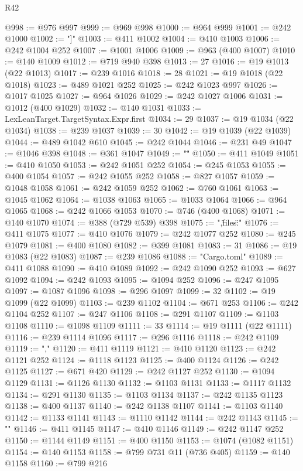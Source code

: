 \begin{lexlean}{R42}
\begin{coremodule}
@998 := @976 @997
@999 := @969 @998
@1000 := @964 @999
@1001 := @242 @1000
@1002 := "]"
@1003 := @411 @1002
@1004 := @410 @1003
@1006 := @242 @1004 @252
@1007 := @1001 @1006
@1009 := @963 (@400 @1007)
@1010 := @140 @1009
@1012 := @719 @940 @398
@1013 := 27
@1016 := @19 @1013 (@22 @1013)
@1017 := @239 @1016
@1018 := 28
@1021 := @19 @1018 (@22 @1018)
@1023 := @489 @1021 @252
@1025 := @242 @1023 @997
@1026 := @1017 @1025
@1027 := @964 @1026
@1029 := @242 @1027 @1006
@1031 := @1012 (@400 @1029)
@1032 := @140 @1031
@1033 := LexLeanTarget.TargetSyntax.Expr.first
@1034 := 29
@1037 := @19 @1034 (@22 @1034)
@1038 := @239 @1037
@1039 := 30
@1042 := @19 @1039 (@22 @1039)
@1044 := @489 @1042 @610
@1045 := @242 @1044
@1046 := @231 @49
@1047 := @1046 @398
@1048 := @361 @1047
@1049 := "\""
@1050 := @411 @1049
@1051 := @410 @1050
@1053 := @242 @1051 @252
@1054 := @245 @1053
@1055 := @400 @1054
@1057 := @242 @1055 @252
@1058 := @827 @1057
@1059 := @1048 @1058
@1061 := @242 @1059 @252
@1062 := @760 @1061
@1063 := @1045 @1062
@1064 := @1038 @1063
@1065 := @1033 @1064
@1066 := @964 @1065
@1068 := @242 @1066 @1053
@1070 := @746 (@400 @1068)
@1071 := @140 @1070
@1074 := @388 (@729 @539) @398
@1075 := ",\"files\":{"
@1076 := @411 @1075
@1077 := @410 @1076
@1079 := @242 @1077 @252
@1080 := @245 @1079
@1081 := @400 @1080
@1082 := @399 @1081
@1083 := 31
@1086 := @19 @1083 (@22 @1083)
@1087 := @239 @1086
@1088 := "Cargo.toml"
@1089 := @411 @1088
@1090 := @410 @1089
@1092 := @242 @1090 @252
@1093 := @627 @1092
@1094 := @242 @1093
@1095 := @1094 @252
@1096 := @247 @1095
@1097 := @1087 @1096
@1098 := @296 @1097
@1099 := 32
@1102 := @19 @1099 (@22 @1099)
@1103 := @239 @1102
@1104 := @671 @253
@1106 := @242 @1104 @252
@1107 := @247 @1106
@1108 := @291 @1107
@1109 := @1103 @1108
@1110 := @1098 @1109
@1111 := 33
@1114 := @19 @1111 (@22 @1111)
@1116 := @239 @1114 @1096
@1117 := @296 @1116
@1118 := @242 @1109
@1119 := ","
@1120 := @411 @1119
@1121 := @410 @1120
@1123 := @242 @1121 @252
@1124 := @1118 @1123
@1125 := @400 @1124
@1126 := @242 @1125
@1127 := @671 @420
@1129 := @242 @1127 @252
@1130 := @1094 @1129
@1131 := @1126 @1130
@1132 := @1103 @1131
@1133 := @1117 @1132
@1134 := @291 @1130
@1135 := @1103 @1134
@1137 := @242 @1135 @1123
@1138 := @400 @1137
@1140 := @242 @1138 @1107
@1141 := @1103 @1140
@1142 := @1133 @1141
@1143 := @1110 @1142
@1144 := @242 @1143
@1145 := "}"
@1146 := @411 @1145
@1147 := @410 @1146
@1149 := @242 @1147 @252
@1150 := @1144 @1149
@1151 := @400 @1150
@1153 := @1074 (@1082 @1151)
@1154 := @140 @1153
@1158 := @799 @731 @11 (@736 @405)
@1159 := @140 @1158
@1160 := @799 @216

\end{coremodule}
\end{lexlean}
